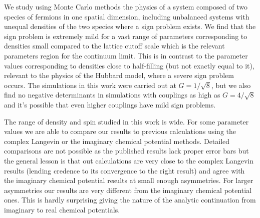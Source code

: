 \documentclass[aps,eqsecnum,amsmath,onecolumn,groupedaddress,superscriptaddress,notitlepage,nofootinbib]{revtex4-1}
\newcommand{\eq}[1]{Eq.~(\ref{#1})}
\begin{document}
We study using Monte Carlo methods the physics of a system composed of  two species of fermions in one spatial dimension, including unbalanced systems with unequal densities of the two species where a sign problem exists. We find that the sign problem is extremely mild for a vast range of parameters corresponding to densities small compared to the lattice cutoff scale which is the relevant parameters region for the continuum limit. This is in contrast to the parameter values corresponding to densities close to half-filling (but not exactly equal to it), relevant to the physics of the Hubbard model, where a severe sign problem occurs. The simulations in this work were carried out at $G =1/\sqrt{8}$, but we also find no negative determinants in simulations with couplings as high as $G=4/\sqrt{8}$ and it's possible that even higher couplings have mild sign problems.

%

The range of density and spin studied in this work is wide. 
For some parameter values we are able to compare our results to previous calculations using the complex Langevin or the imaginary chemical potential methods. Detailed comparisons are not possible as the published results lack proper error bars but the general lesson is that out calculations are very close to the complex Langevin results (lending credence to its convergence to the right result) and agree with the imaginary chemical potential results at small enough asymmetries. For larger asymmetries  our results are very different from the imaginary chemical potential ones. This is hardly surprising giving the nature of the analytic continuation from imaginary to real chemical potentials.
\end{document}

